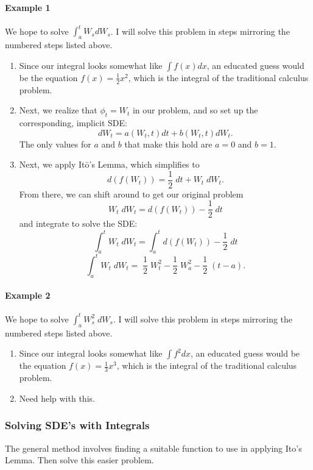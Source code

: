 \documentclass[a4paper,12pt]{scrartcl}
\begin{document}
\paragraph{Example 1} We hope to solve $\int^t_a W_s dW_s$. I will 
solve this problem in steps mirroring the numbered steps listed above.
\begin{enumerate}
   \item{Since our integral looks somewhat like $\int f(x) dx$, an
      educated guess would be the equation $f(x) = \frac{1}{2} x^2$, 
      which is the integral of the traditional calculus problem.
      }
   \item{Next, we realize that $\phi_t = W_t$ in our problem, and 
      so set up the corresponding, implicit SDE:
      \[ dW_t = a(W_t, t) dt + b(W_t, t) dW_t.\]
      The only values for $a$ and $b$ that make this hold are $a=0$
      and $b=1$.
      }
   \item{Next, we apply It\={o}'s Lemma, which simplifies to
	 \[d(f(W_t)) = \frac{1}{2}\; dt + W_t \; dW_t. \]
      From there, we can shift around to get our original problem
	 \[W_t \; dW_t= d(f(W_t)) -\frac{1}{2}\; dt \]
      and integrate to solve the SDE:
	 \[ \int^t_a W_t \; dW_t =\int^t_a d(f(W_t))-\frac{1}{2}\;dt\]
	 \[ \int^t_a W_t \; dW_t=\;\frac{1}{2}\;W^2_t-\frac{1}{2}\;W^2_a
	    - \frac{1}{2}\;(t-a).\]
      }
\end{enumerate}

\paragraph{Example 2} We hope to solve $\int^t_a W^2_s\;dW_s$. I will 
solve this problem in steps mirroring the numbered steps listed above.
\begin{enumerate}
   \item{Since our integral looks somewhat like $\int f^2 dx$, an
      educated guess would be the equation $f(x) = \frac{1}{3} x^3$, 
      which is the integral of the traditional calculus problem.
      }
   \item{Need help with this.}
   
\end{enumerate}

\subsubsection{Solving SDE's with Integrals}

The general method involves finding a suitable function to use in 
applying It{o}'s Lemma. Then solve this easier problem.
\end{document}
